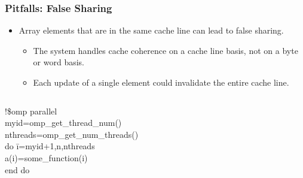 \documentclass[slidestop,mathserif,compress,xcolor=svgnames]{beamer}
\newenvironment{eblock}[0]
{
\begin{beamerboxesrounded}[upper=uppercol2,lower=lowercol2,shadow=true]}
{\end{beamerboxesrounded}}
\begin{document}
\begin{frame}
  \frametitle{\small Pitfalls: False Sharing}
  \begin{itemize}
    \item Array elements that are in the same cache line can lead to false sharing.
    \begin{itemize}
      \item The system handles cache coherence on a cache line basis, not on a byte or word basis.
      \item Each update of a single element could invalidate the entire cache line.
    \end{itemize}
  \end{itemize}
  \begin{columns}
    \column{5cm}
    \begin{eblock}{}
      \begin{tabbing}
        !\$omp parallel \\
        myid=omp\_get\_thread\_num() \\
        nthreads=omp\_get\_num\_threads() \\
        do \=i=myid+1,n,nthreads \\
        \> a(i)=some\_function(i) \\
        end do 
      \end{tabbing}
    \end{eblock}
  \end{columns}
\end{frame}
\end{document}
